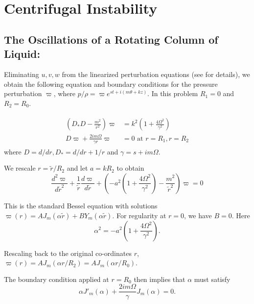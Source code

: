 \chapter{Centrifugal Instability}
\section{The Oscillations of a Rotating Column of Liquid:}
Eliminating $u, v, w$ from the linearized perturbation equations (see \cite{drazin2004hydrodynamic} for details), we obtain the following equation and boundary conditions for the pressure perturbation  $\varpi$, where $p/\rho = \varpi e^{st + i(m\theta + k z)}$. In this problem $R_{1}=0$ and $R_{2}=R_{0}$. 

\begin{align}\label{eq:3_1_pressure_perturbation}
 \begin{split}
    \left(D_{*}D - \frac{m^{2}}{r^{2}} \right)\varpi &= k^{2}\left( 1 + \frac{4\Omega^{2}}{\gamma^{2}}\right)\\
    D\varpi + \frac{2im\Omega}{\gamma r} \varpi &= 0 \textrm{ at } r = R_{1}, r=R_{2} 
 \end{split}
\end{align}
where $D = d/dr, D_{*} = d/dr + 1/r$ and $\gamma = s + i m \Omega$. 

We rescale $r = \tilde{r}/R_{2}$ and let $a = kR_{2}$ to obtain
\begin{equation}\label{eq:3_1_bessel}
 \frac{d^{2}\varpi}{d\tilde{r}^{2}} + \frac{1}{\tilde{r}}\frac{d\varpi}{d\tilde{r}} + \left(-a^{2}\left( 1 + \frac{4\Omega^{2}}{\gamma^{2}}\right) - \frac{m^{2}}{\tilde{r}^{2}} \right)\varpi = 0
\end{equation}

This is the standard Bessel equation with solutions $\varpi(r) = A J_{m}(\alpha \tilde{r}) + B Y_{m}(\alpha \tilde{r})$. For regularity at $r=0$, we have $B = 0$. Here 
\begin{equation}\label{eq:3_1_alpha}
\boxed{\alpha^{2} = -a^{2}\left( 1 + \frac{4\Omega^{2}}{\gamma^{2}}\right)}. 
\end{equation}

Rescaling back to the original co-ordinates $r$, 
$\boxed{\varpi(r) = AJ_{m}(\alpha r/R_{2}) = AJ_{m}(\alpha r/R_{0})}$. 

The boundary condition applied at $r = R_{0}$ then implies that $\alpha$ must satisfy
\begin{equation}\label{eq:3_1_bc}
 \alpha J'_{m}(\alpha) + \frac{2im\Omega}{\gamma} J_{m}(\alpha) = 0.
\end{equation}

